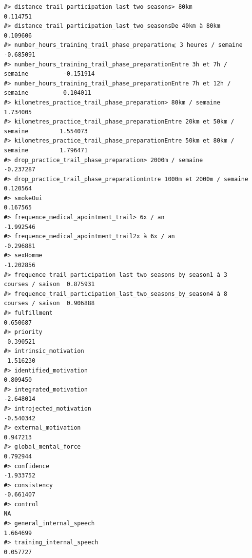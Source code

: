 \documentclass[
]{article}
\begin{document}
\begin{verbatim}
#> distance_trail_participation_last_two_seasons> 80km                             0.114751
#> distance_trail_participation_last_two_seasonsDe 40km à 80km                     0.109606
#> number_hours_training_trail_phase_preparation⩽ 3 heures / semaine              -0.685091
#> number_hours_training_trail_phase_preparationEntre 3h et 7h / semaine          -0.151914
#> number_hours_training_trail_phase_preparationEntre 7h et 12h / semaine          0.104011
#> kilometres_practice_trail_phase_preparation> 80km / semaine                     1.734005
#> kilometres_practice_trail_phase_preparationEntre 20km et 50km / semaine         1.554073
#> kilometres_practice_trail_phase_preparationEntre 50km et 80km / semaine         1.796471
#> drop_practice_trail_phase_preparation> 2000m / semaine                         -0.237287
#> drop_practice_trail_phase_preparationEntre 1000m et 2000m / semaine             0.120564
#> smokeOui                                                                        0.167565
#> frequence_medical_apointment_trail> 6x / an                                    -1.992546
#> frequence_medical_apointment_trail2x à 6x / an                                 -0.296881
#> sexHomme                                                                       -1.202856
#> frequence_trail_participation_last_two_seasons_by_season1 à 3 courses / saison  0.875931
#> frequence_trail_participation_last_two_seasons_by_season4 à 8 courses / saison  0.906888
#> fulfillment                                                                     0.650687
#> priority                                                                       -0.390521
#> intrinsic_motivation                                                           -1.516230
#> identified_motivation                                                           0.809450
#> integrated_motivation                                                          -2.648014
#> introjected_motivation                                                         -0.540342
#> external_motivation                                                             0.947213
#> global_mental_force                                                             0.792944
#> confidence                                                                     -1.933752
#> consistency                                                                    -0.661407
#> control                                                                               NA
#> general_internal_speech                                                         1.664699
#> training_internal_speech                                                        0.057727

\end{verbatim}
\end{document}
